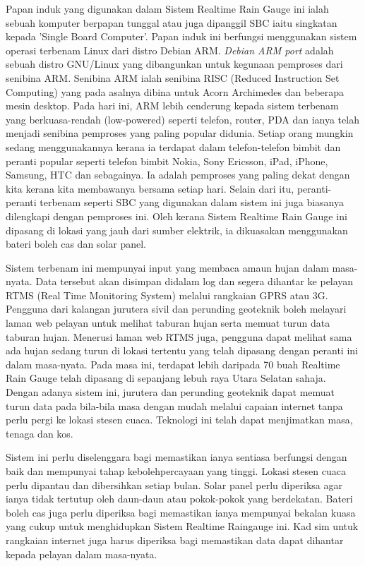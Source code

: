 Papan induk yang digunakan dalam Sistem Realtime Rain Gauge ini ialah sebuah komputer berpapan tunggal atau juga dipanggil SBC iaitu singkatan kepada 'Single Board Computer'. Papan induk ini berfungsi menggunakan sistem operasi terbenam Linux dari distro Debian ARM\cite{w4}. \textit{Debian ARM port} adalah sebuah distro GNU/Linux yang dibangunkan untuk kegunaan pemproses dari senibina ARM. Senibina ARM ialah senibina RISC (Reduced Instruction Set Computing) yang pada asalnya dibina untuk Acorn Archimedes dan beberapa mesin desktop. Pada hari ini, ARM lebih cenderung kepada sistem terbenam yang berkuasa-rendah (low-powered) seperti telefon, router, PDA dan ianya telah menjadi senibina pemproses yang paling popular didunia. Setiap orang mungkin sedang menggunakannya kerana ia terdapat dalam telefon-telefon bimbit dan peranti popular seperti telefon bimbit Nokia, Sony Ericsson, iPad, iPhone, Samsung, HTC dan sebagainya. Ia adalah pemproses yang paling dekat dengan kita kerana kita membawanya bersama setiap hari. Selain dari itu, peranti-peranti terbenam seperti SBC yang digunakan dalam sistem ini juga biasanya dilengkapi dengan pemproses ini. Oleh kerana Sistem Realtime Rain Gauge ini dipasang di lokasi yang jauh dari sumber elektrik, ia dikuasakan menggunakan bateri boleh cas dan solar panel.

Sistem terbenam ini mempunyai input yang membaca amaun hujan dalam masa-nyata. Data tersebut akan disimpan didalam log dan segera dihantar ke pelayan RTMS (Real Time Monitoring System) melalui rangkaian GPRS atau 3G. Pengguna dari kalangan jurutera sivil dan perunding geoteknik boleh melayari laman web pelayan untuk melihat taburan hujan serta memuat turun data taburan hujan. Menerusi laman web RTMS juga, pengguna dapat melihat sama ada hujan sedang turun di lokasi tertentu yang telah dipasang dengan peranti ini dalam masa-nyata. Pada masa ini, terdapat lebih daripada 70 buah Realtime Rain Gauge telah dipasang di sepanjang lebuh raya Utara Selatan sahaja. Dengan adanya sistem ini, jurutera dan perunding geoteknik dapat memuat turun data pada bila-bila masa dengan mudah melalui capaian internet tanpa perlu pergi ke lokasi stesen cuaca. Teknologi ini telah dapat menjimatkan masa, tenaga dan kos. 

Sistem ini perlu diselenggara bagi memastikan ianya sentiasa berfungsi dengan baik dan mempunyai tahap kebolehpercayaan yang tinggi. Lokasi stesen cuaca perlu dipantau dan dibersihkan setiap bulan. Solar panel perlu diperiksa agar ianya tidak tertutup oleh daun-daun atau pokok-pokok yang berdekatan. Bateri boleh cas juga perlu diperiksa bagi memastikan ianya mempunyai bekalan kuasa yang cukup untuk menghidupkan Sistem Realtime Raingauge ini. Kad sim untuk rangkaian internet juga harus diperiksa bagi memastikan data dapat dihantar kepada pelayan dalam masa-nyata.

